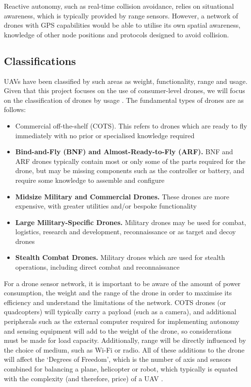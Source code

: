 Reactive autonomy, such as real-time collision avoidance, relies on situational awareness, which is typically provided by range sensors. However, a network of drones with GPS capabilities would be able to utilise its own spatial awareness, knowledge of other node positions and protocols designed to avoid collision. 

\subsection{Classifications}
UAVs have been classified by such areas as weight, functionality, range and usage. Given that this project focuses on the use of consumer-level drones, we will focus on the classification of drones by usage \cite{yashgarg2015}. The fundamental types of drones are as follows:

\begin{itemize}
\item Commercial off-the-shelf (COTS). This refers to drones which are ready to fly immediately with no prior or specialised knowledge required
\item\textbf{ Bind-and-Fly (BNF) and Almost-Ready-to-Fly (ARF).}  BNF and ARF drones typically contain most or only some of the parts required for the drone, but may be missing components such as the controller or battery, and require some knowledge to assemble and configure
\item \textbf{Midsize Military and Commercial Drones.} These drones are more expensive, with greater utilities and/or bespoke functionality
\item \textbf{Large Military-Specific Drones.} Military drones may be used for combat, logistics, research and development, reconnaissance or as target and decoy drones
\item \textbf{Stealth Combat Drones.} Military drones which are used for stealth operations, including direct combat and reconnaissance

\end{itemize}
For a drone sensor network, it is important to be aware of the amount of power consumption, the weight and the range of the drone in order to maximise its efficiency and understand the limitations of the network. COTS drones (or quadcopters) will typically carry a payload (such as a camera), and additional peripherals such as the external computer required for implementing autonomy and sensing equipment will add to the weight of the drone, so considerations must be made for load capacity. Additionally, range will be directly influenced by the choice of medium, such as Wi-Fi or radio. All of these additions to the drone will affect the ‘Degrees of Freedom’, which is the number of axis and sensors combined for balancing a plane, helicopter or robot, which typically is equated with the complexity (and therefore, price) of a UAV \cite{arduinodof2012}.

